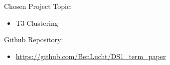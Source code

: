   \vspace*{\fill}
  
  \large
  \noindent{}Chosen Project Topic: %
  \begin{itemize}
  \item T3 Clustering
  \end{itemize}
  \noindent{}Github Repository: %
  \begin{itemize}
  \item \url{https://github.com/BenLucht/DS1_term_paper}
  \end{itemize}